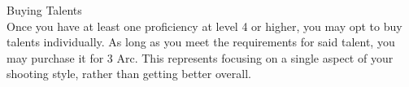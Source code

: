 \documentclass[a4paper, twocolumn, openany]{book}
\begin{document}
{

{\large Buying Talents\\}
Once you have at least one proficiency at level 4 or higher, you may opt to buy talents
individually. As long as you meet the requirements for said talent, you may purchase it for 3 Arc.
This represents focusing on a single aspect of your shooting style, rather than getting better
overall.\\

}
\end{document}
